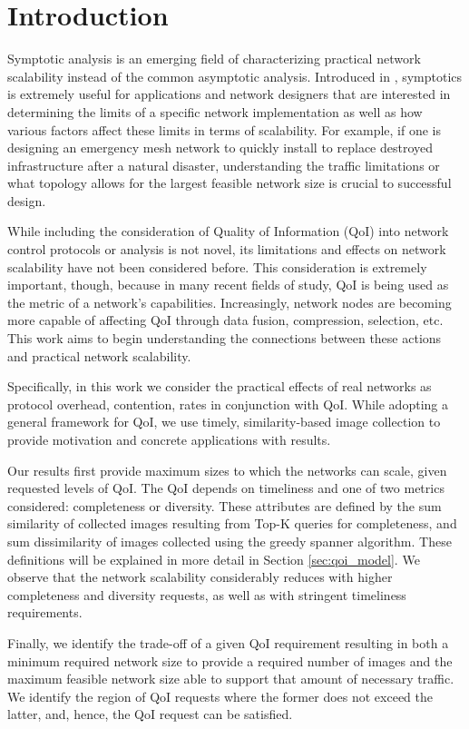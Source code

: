 
\section{Introduction}
\label{sec:intro}

Symptotic analysis is an emerging field of characterizing practical network scalability instead of the common asymptotic analysis.  Introduced in \cite{scalability_manets_theory_vs_practice}, symptotics is extremely useful for applications and network designers that are interested in determining the limits of a specific network implementation as well as how various factors affect these limits in terms of scalability.  For example, if one is designing an emergency mesh network to quickly install to replace destroyed infrastructure after a natural disaster, understanding the traffic limitations or what topology allows for the largest feasible network size is crucial to successful design.

While including the consideration of Quality of Information (QoI) into network control protocols or analysis is not novel, its limitations and effects on network scalability have not been considered before.  This consideration is extremely important, though, because in many recent fields of study, QoI is being used as the metric of a network's capabilities.  Increasingly, network nodes are becoming more capable of affecting QoI through data fusion, compression, selection, etc.  This work aims to begin understanding the connections between these actions and practical network scalability.

Specifically, in this work we consider the practical effects of real networks as protocol overhead, contention, rates in conjunction with QoI.  While adopting a general framework for QoI, we use timely, similarity-based image collection to provide motivation and concrete applications with results.  

Our results first provide maximum sizes to which the networks can scale, given requested levels of QoI. The QoI depends on timeliness and one of two metrics considered: completeness or diversity.  These attributes are defined by the sum similarity of collected images resulting from Top-K queries for completeness, and sum dissimilarity of images collected using the greedy spanner algorithm. These definitions will be explained in more detail in Section \ref{sec:qoi_model}.  We observe that the network scalability considerably reduces with higher completeness and diversity requests, as well as with stringent timeliness requirements.  

Finally, we identify the trade-off of a given QoI requirement resulting in both a minimum required network size to provide a required number of images and the maximum feasible network size able to support that amount of necessary traffic.  We identify the region of QoI requests where the former does not exceed the latter, and, hence, the QoI request can be satisfied. 


